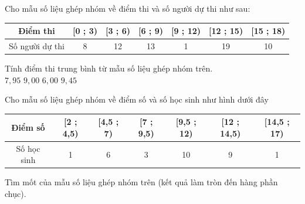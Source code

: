 \begin{ex}
	Cho mẫu số liệu ghép nhóm về điểm thi và số người dự thi như sau:
	
	\begin{center}\begin{tabular}{|c|c|c|c|c|c|c|}
			\hline
			Điểm thi   & [0 ; 3) & [3 ; 6) & [6 ; 9) & [9 ; 12) & [12 ; 15) & [15 ; 18)\\  
			\hline 
			Số người dự thi & 8 & 12 & 13 & 1 & 19 & 10 \\ 
			\hline 
		\end{tabular}
	\end{center}
	Tính điểm thi trung bình từ mẫu số liệu ghép nhóm trên.\\
	\choice
	{ $ {7,95}$ }
	{ $ {9,00}$ }
	{ $ {6,00}$ }
	{ \True ${9,45}$ }
	\end{ex}
\begin{ex}
	Cho mẫu số liệu ghép nhóm về điểm số và số học sinh như hình dưới đây
	\begin{center}\begin{tabular}{|c|c|c|c|c|c|c|}
			\hline
			Điểm số   & [2 ; 4,5) & [4,5 ; 7) & [7 ; 9,5) & [9,5 ; 12) & [12 ; 14,5) & [14,5 ; 17)\\  
			\hline 
			Số học sinh & 1 & 6 & 3 & 10 & 9 & 1 \\ 
			\hline 
		\end{tabular}
	\end{center}
Tìm mốt của mẫu số liệu ghép nhóm trên (kết quả làm tròn đến hàng phần chục).\\
	\end{ex}

